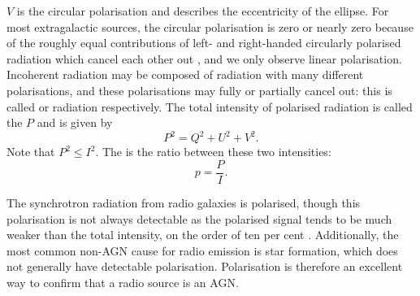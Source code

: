         $V$ is the circular polarisation and describes the eccentricity of the ellipse. For most extragalactic sources, the circular polarisation is zero or nearly zero \citep{rayner_radio_2000,saikia_polarization_1988} because of the roughly equal contributions of left- and right-handed circularly polarised radiation which cancel each other out \citeneeded{}, and we only observe linear polarisation. Incoherent radiation may be composed of radiation with many different polarisations, and these polarisations may fully or partially cancel out: this is called  or  radiation respectively. The total intensity of polarised radiation is called the  $P$ and is given by
        \begin{equation}
            \label{eq:polarised-intensity}
            P^2 = Q^2 + U^2 + V^2.
        \end{equation}
        Note that $P^2 \leq I^2$. The  is the ratio between these two intensities:
        \begin{equation}
            p = \frac{P}{I}.
        \end{equation}

        The synchrotron radiation from radio galaxies is polarised, though this polarisation is not always detectable as the polarised signal tends to be much weaker than the total intensity, on the order of ten per cent \citeneeded {}. Additionally, the most common non-AGN cause for radio emission is star formation, which does not generally have detectable polarisation. Polarisation is therefore an excellent way to confirm that a radio source is an AGN.

